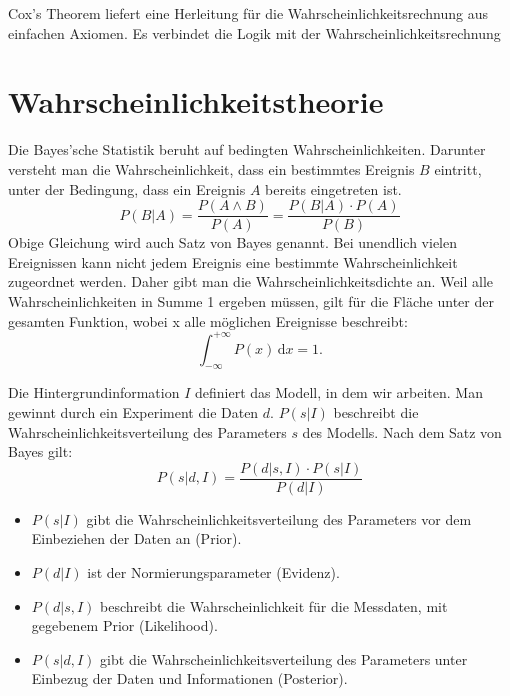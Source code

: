 \documentclass[]{dsadokumentation}
\begin{document}
Cox's Theorem liefert eine Herleitung für die Wahrscheinlichkeitsrechnung aus einfachen Axiomen. Es verbindet die Logik mit der Wahrscheinlichkeitsrechnung

\section{Wahrscheinlichkeitstheorie}

Die Bayes'sche Statistik beruht auf bedingten Wahrscheinlichkeiten. Darunter versteht man die Wahrscheinlichkeit, dass ein bestimmtes Ereignis $B$ eintritt, unter der Bedingung, dass ein Ereignis $A$ bereits eingetreten ist.
\begin{equation}
P(B|A) = \frac{P(A \wedge B)}{P(A)} = \frac{P(B|A)\cdot P(A)}{P(B)}
\end{equation}
Obige Gleichung wird auch Satz von Bayes genannt. Bei unendlich vielen Ereignissen kann nicht jedem Ereignis eine bestimmte Wahrscheinlichkeit zugeordnet werden. Daher gibt man die Wahrscheinlichkeitsdichte an. Weil alle Wahrscheinlichkeiten in Summe 1 ergeben müssen, gilt für die Fläche unter der gesamten Funktion, wobei x alle möglichen Ereignisse beschreibt:
\begin{equation}
\int_{- \infty }^ {+ \infty} P(x) \,\mbox{d}x = 1.
\end{equation}

 Die Hintergrundinformation $I$ definiert das Modell, in dem wir arbeiten. Man gewinnt durch ein Experiment die Daten $d$. $P(s|I)$ beschreibt die Wahrscheinlichkeitsverteilung des Parameters $s$ des Modells. Nach dem Satz von Bayes gilt:
\begin{equation}
P(s|d,I) = \frac{P(d|s,I)\cdot P(s|I)}{P(d|I)}
\end{equation}

\begin{itemize}
 \item $P(s|I)$ gibt die Wahrscheinlichkeitsverteilung des Parameters vor dem Einbeziehen der Daten an (Prior).
 \item $P(d|I)$ ist der Normierungsparameter (Evidenz).
 \item $P(d|s,I)$ beschreibt die Wahrscheinlichkeit für die Messdaten, mit gegebenem Prior (Likelihood).
 \item $P(s|d,I)$ gibt die Wahrscheinlichkeitsverteilung des Parameters unter Einbezug der Daten und Informationen (Posterior).
\end{itemize}
\end{document}
